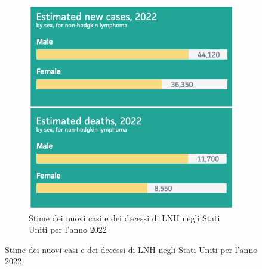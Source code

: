 \begin{figure}
    \begin{subfigure}[b]{0.5\textwidth}
            \includegraphics[width=\linewidth]{img/incidence-mortality.JPEG}
            \caption{Stime dei nuovi casi e dei decessi di LNH negli Stati Uniti per l’anno 2022}
            

\end{subfigure}
\end{figure}
